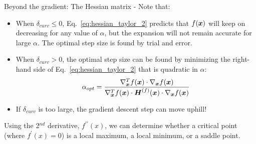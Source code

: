 \begin{frame}[t,allowframebreaks]{
    Beyond the gradient: The Hessian matrix -}
    Note that:
    \begin{itemize}
        \item 
        When $\delta_{curv} \le 0$, Eq.~\ref{eq:hessian_taylor_2} predicts that
        $f(\boldsymbol{x})$ will keep on decreasing for any value of $\alpha$,
        but the expansion will not remain accurate 
        for large $\alpha$.
        The optimal step size is found by trial and error.\\
        \item 
        When $\delta_{curv} > 0$, the optimal step size can be found by minimizing the 
        right-hand side of Eq.~\ref{eq:hessian_taylor_2} that is quadratic in $\alpha$:
        \begin{equation}
            \alpha_{opt} = 
            \frac{
                \nabla_{\boldsymbol{x}}^{T}f(\boldsymbol{x}) \cdot 
                \nabla_{\boldsymbol{x}}f(\boldsymbol{x})
            }{
                \nabla_{\boldsymbol{x}}^{T}f(\boldsymbol{x}) \cdot
                \boldsymbol{H}^{(f)}(\boldsymbol{x}) \cdot 
                \nabla_{\boldsymbol{x}}f(\boldsymbol{x})
            }
            \label{eq:taylor_optimum_step_1}     
        \end{equation}
        \item 
        If $\delta_{curv}$ is too large, 
        the \gls{gradient descent} 
        step can move uphill!
    \end{itemize}

    \framebreak


    Using the 2$^{nd}$ derivative, $f^{\prime \prime}(x)$, we can determine whether a
    \gls{critical point} (where $f^{\prime}(x)=0$) is a
    \gls{local maximum}, a
    \gls{local minimum}, or a
    \gls{saddle point}.\\        
    \vspace{-0.1cm}


\end{frame}
